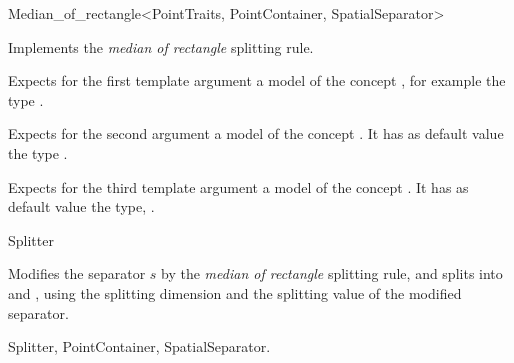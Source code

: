 
\begin{ccRefFunctionObjectClass}{Median_of_rectangle<PointTraits, PointContainer, SpatialSeparator>}

\ccDefinition
Implements the {\em median of rectangle} splitting rule.

\ccParameters

Expects for the first template argument a model of
the concept , for example
the type .

Expects for the second argument a model of the concept . It has as default value
the type .

Expects for the third template argument a model of the concept . It has as default value
the type, .


\ccIsModel

Splitter

\ccTypes



\ccOperations

{Modifies the separator $s$ by the {\em median of rectangle} splitting rule, 
and splits  into  and ,
using the splitting dimension and the splitting value of the modified separator.
}

\ccSeeAlso

Splitter, PointContainer, SpatialSeparator.
\end{ccRefFunctionObjectClass}




